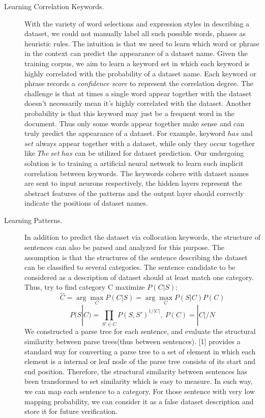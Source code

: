 \documentclass[fleqn]{article}
\begin{document}
\begin{description}
\item [Learning Correlation Keywords.] 
With the variety of word selections and expression styles in describing a dataset, we could not manually label all such possible words, phases as heuristic rules. The intuition is that we need to learn which word or phrase in the context can predict the appearance of a dataset name. Given the training corpus, we aim to learn a keyword set in which each keyword is highly correlated with the probability of a dataset name. Each keyword or phrase records a \emph{confidence score} to represent the correlation degree. The challenge is that at times a single word appear together with the dataset doesn't necessarily mean it's highly correlated with the dataset. Another probability is that this keyword may just be a frequent word in the document. Thus only some words appear together make sense and can truly predict the appearance of a dataset. For example, keyword $has$ and $set$ always appear together with a dataset, while only they occur together like $The \ set \ has$ can be utilized for dataset prediction. Our undergoing solution is to training a artificial neural network to learn such implicit correlation between keywords. The keywords cohere with dataset names are sent to input neurons respectively, the hidden layers represent the abstract features of the patterns and the output layer should correctly indicate the positions of dataset names.

\item[Learning Patterns.] In addition to predict the dataset via collocation keywords, the structure of sentences can also be parsed and analyzed for this purpose. The assumption is that the structures of the sentence describing the dataset can be classified to several categories. The sentence candidate to be considered as a description of dataset should at least match one category. Thus, try to find category C maximize $P(C|S)$:  
$$\hat{C} = \arg \max_C P(C|S) = \arg \max_C P(S|C) P(C)$$ 
$$P(S|C) = {\prod_{S' \in C} P(S, S')}^{1/|C|}, \ P(C) = |C| / N$$
We constructed a parse tree for each sentence, and evaluate the structural similarity between parse trees(thus between sentences). [1] provides a standard way for converting a parse tree to a set of element in which each element is a internal or leaf node of the parse tree consists of its start and end position. Therefore, the structural similarity between sentences has been transformed to set similarity which is easy to measure. In such way, we can map each sentence to a category. For those sentence with very low mapping probability, we can consider it as a false dataset description and store it for future verification.


\end{description}
\end{document}
